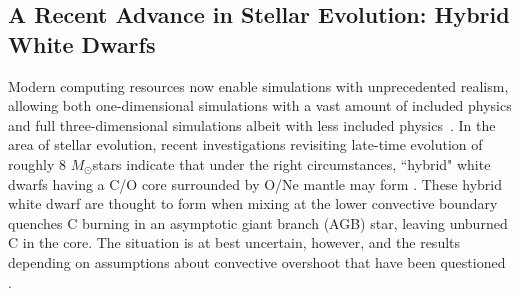 \documentclass[iop,apj]{emulateapj}
\newcommand{\Msun}{\ensuremath{M_\odot}}
\begin{document}
%
%
%
%
%
%
%
%
%

\subsection{A Recent Advance in Stellar Evolution: Hybrid White Dwarfs}

Modern computing resources now enable simulations with unprecedented 
realism, allowing both one-dimensional simulations with a vast
amount of included physics and full three-dimensional simulations
albeit with less included physics~\citep{caldertownsley2018}.
In the area of stellar evolution, recent investigations revisiting 
late-time evolution of roughly 8 \Msun stars indicate that under
the right circumstances, ``hybrid" white dwarfs having a C/O core surrounded by O/Ne 
mantle may form \citep{siess2009,denissenkovetal2013}. These hybrid
white dwarf are thought to form when mixing at the lower convective boundary quenches
C burning in an asymptotic giant branch (AGB) star, leaving unburned C
in the core. The situation is at best uncertain, however, and the 
results depending on assumptions about convective
overshoot that have been questioned \citep{chenetal2014,lecoanetetal16,lattanzioetal2017}.
\end{document}
